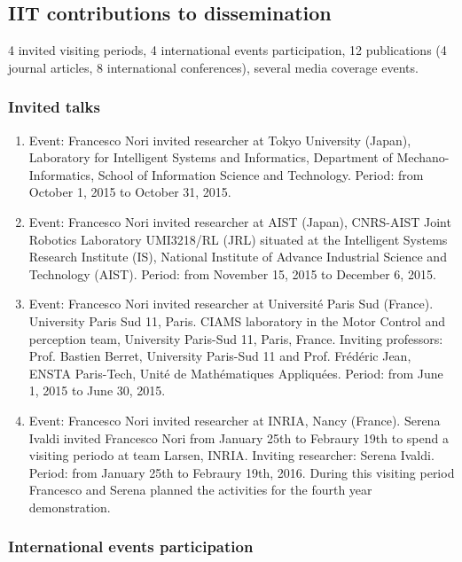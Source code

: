 \subsection{IIT contributions to dissemination}

4 invited visiting periods, 4 international events participation, 12 publications (4 journal articles, 8 international conferences), several media coverage events.

\subsubsection{Invited talks}

\begin{enumerate}

\item  Event: Francesco Nori invited researcher at Tokyo University (Japan), Laboratory for Intelligent Systems and Informatics, Department of Mechano-Informatics, School of Information Science and Technology. Period: from October 1, 2015 to October 31, 2015.

\item  Event: Francesco Nori invited researcher at AIST (Japan), CNRS-AIST Joint Robotics Laboratory UMI3218/RL (JRL) situated at the Intelligent Systems Research Institute (IS), National Institute of Advance Industrial Science and Technology (AIST). Period: from November 15, 2015 to December 6, 2015.

\item  Event: Francesco Nori invited researcher at Université Paris Sud (France). University Paris Sud 11, Paris. CIAMS laboratory in the Motor Control and perception team, University Paris-Sud 11, Paris, France. Inviting professors: Prof. Bastien Berret, University Paris-Sud 11 and Prof. Fr\'ed\'eric Jean, ENSTA Paris-Tech, Unit\'e de Math\'ematiques Appliqu\'ees. Period: from June 1, 2015 to June 30, 2015.

\item  Event: Francesco Nori invited researcher at INRIA, Nancy (France). Serena Ivaldi invited Francesco Nori from January 25th to Febraury 19th to spend a visiting periodo at team Larsen, INRIA. Inviting researcher: Serena Ivaldi. Period: from January 25th to Febraury 19th, 2016. During this visiting period Francesco and Serena planned the activities for the fourth year demonstration.
\end{enumerate}

\subsubsection{International events participation}


